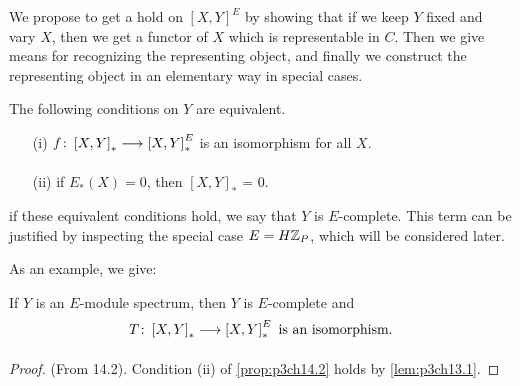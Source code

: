 \documentclass[../main]{subfiles}
\begin{document}
We propose to get a hold on $\left[ X,Y \right]^E$ by showing that if we keep $Y$ fixed and vary $X$, then we get a functor of $X$ which is representable in  $C$. Then we give means for recognizing the representing object, and finally we construct the representing object in an elementary way in special cases.
\begin{proposition} \label{prop:p3ch14.2}
The following conditions on $Y$ are equivalent. 
 \begin{enumerate}
   \item [(i)] $f\colon \left[ X,Y \right] _{\ast} \lar{} \left[ X,Y \right]^E_{\ast} $ is an isomorphism for all $X$. 
   \item [(ii)] if $E_{\ast}(X)=0$, then $\left[ X,Y \right] _{\ast}$ = 0. 
\end{enumerate} 
if these equivalent conditions hold, we say that $Y$ is $E$-complete. This term can be justified by inspecting the special case $E=H\mathbb{Z}_{P}$, which will be considered later. 
\end{proposition}
    As an example, we give:
    \begin{corollary} \label{cor:p3ch14.3}
    If $Y$ is an $E$-module spectrum, then $Y$ is $E$-complete and 
    \[
    T\colon \left[ X,Y \right] _{\ast} \lar{} \left[ X,Y \right]^E _{\ast} \text{ is an isomorphism.}
    \] 
    \begin{proof} 
        (From 14.2). Condition (ii) of \ref{prop:p3ch14.2} holds by \ref{lem:p3ch13.1}.
    \end{proof}  
    \end{corollary}
\end{document}
